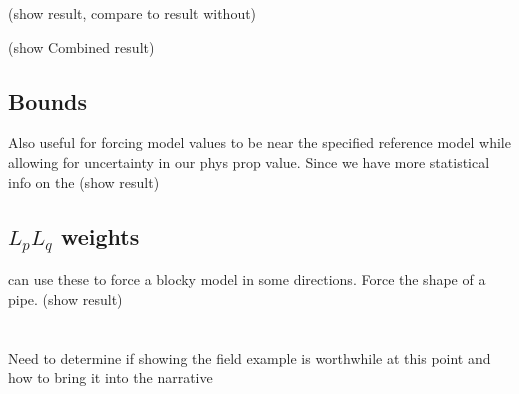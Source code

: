 (show result, compare to result without)


(show Combined result)
\subsection{Bounds}
\label{sec:Bounds:TKC}

Also useful for forcing model values to be near the specified reference model while allowing for uncertainty in our phys prop value. Since we have more statistical info on the 
(show result)

\subsection{$L_p L_q$ weights}
\label{sec:Lp Lq weights:TKC}

can use these to force a blocky model in some directions. Force the shape of a pipe.
(show result)
\\\\\\
Need to determine if showing the field example is worthwhile at this point and how to bring it into the narrative

\endinput

Any text after an \endinput is ignored.
You could put scraps here or things in progress.

